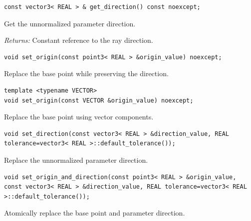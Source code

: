 \par\noindent\begin{minipage}{\linewidth}
\begin{lstlisting}[style=apireference]
const vector3< REAL > & get_direction() const noexcept;
\end{lstlisting}
{\footnotesize Get the unnormalized parameter direction.\par}
{\footnotesize\textit{Returns:} Constant reference to the ray direction.\par}
\end{minipage}\par\vspace{1pt}
\par\noindent\begin{minipage}{\linewidth}
\begin{lstlisting}[style=apireference]
void set_origin(const point3< REAL > &origin_value) noexcept;
\end{lstlisting}
{\footnotesize Replace the base point while preserving the direction.\par}
\end{minipage}\par\vspace{1pt}
\par\noindent\begin{minipage}{\linewidth}
\begin{lstlisting}[style=apireference]
template <typename VECTOR>
void set_origin(const VECTOR &origin_value) noexcept;
\end{lstlisting}
{\footnotesize Replace the base point using vector components.\par}
\end{minipage}\par\vspace{1pt}
\par\noindent\begin{minipage}{\linewidth}
\begin{lstlisting}[style=apireference]
void set_direction(const vector3< REAL > &direction_value, REAL tolerance=vector3< REAL >::default_tolerance());
\end{lstlisting}
{\footnotesize Replace the unnormalized parameter direction.\par}
\end{minipage}\par\vspace{1pt}
\par\noindent\begin{minipage}{\linewidth}
\begin{lstlisting}[style=apireference]
void set_origin_and_direction(const point3< REAL > &origin_value, const vector3< REAL > &direction_value, REAL tolerance=vector3< REAL >::default_tolerance());
\end{lstlisting}
{\footnotesize Atomically replace the base point and parameter direction.\par}
\end{minipage}\par\vspace{1pt}
